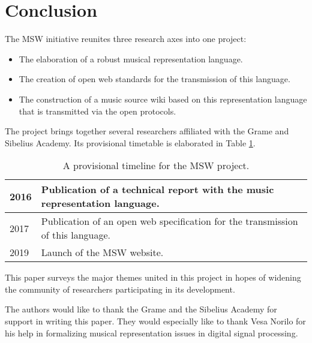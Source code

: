 \documentclass{article}
\begin{document}
\section{Conclusion}\label{sec:conclusion}
The MSW initiative reunites three research axes into one project:
\begin{itemize}
\item The elaboration of a robust musical representation language.
\item The creation of open web standards for the transmission of this
language.
\item The construction of a music source wiki based on this representation
language that is transmitted via the open protocols.
\end{itemize}
The project brings together several researchers affiliated with the Grame
and Sibelius Academy.  Its provisional timetable is elaborated in Table
\ref{tab:timeline}.
\begin{table}[h]
\begin{center}
\begin{tabular}{|l|p{6cm}|}\hline
2016 & Publication of a technical report with the music representation
language. \\\hline
2017 & Publication of an open web specification for the transmission of this
language. \\\hline
2019 & Launch of the MSW website. \\\hline
\end{tabular}
\end{center}
 \caption{A provisional timeline for the MSW project.}
 \label{tab:timeline}
\end{table}
This paper surveys the major themes united in this project in hopes of
widening the community of researchers participating in its development.
\begin{acknowledgments}
The authors would like to thank the Grame and the Sibelius Academy for
support in writing this paper. They would especially like to thank Vesa
Norilo for his help in formalizing musical representation issues in
digital signal processing.
\end{acknowledgments} 


\end{document}

